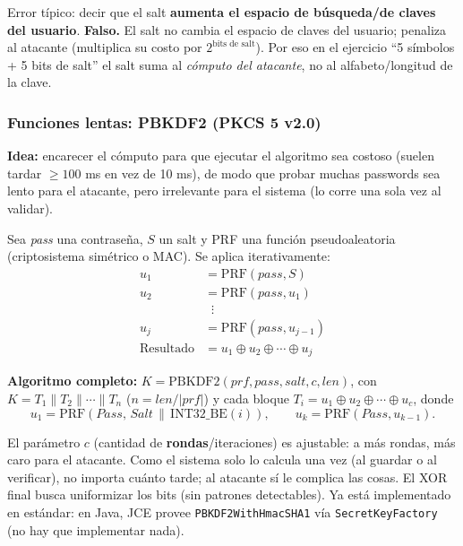 \documentclass[../main.tex]{subfiles}
\begin{document}
\begin{ojo}
Error típico: decir que el salt \textbf{aumenta el espacio de búsqueda/de claves del usuario}. \textbf{Falso.} El salt no cambia el espacio de claves del usuario; penaliza al atacante (multiplica su costo por $2^{\text{bits de salt}}$). Por eso en el ejercicio ``5 símbolos + 5 bits de salt'' el salt suma al \emph{cómputo del atacante}, no al alfabeto/longitud de la clave.
\end{ojo}

\subsubsection{Funciones lentas: PBKDF2 (PKCS 5 v2.0)}

\textbf{Idea:} encarecer el cómputo para que ejecutar el algoritmo sea costoso (suelen tardar $\ge 100$ ms en vez de 10 ms), de modo que probar muchas passwords sea lento para el atacante, pero irrelevante para el sistema (lo corre una sola vez al validar).

Sea \textit{pass} una contraseña, $S$ un salt y PRF una función pseudoaleatoria (criptosistema simétrico o MAC). Se aplica iterativamente:
\begin{align}
u_1 &= \text{PRF}(\textit{pass}, S)\\
u_2 &= \text{PRF}(\textit{pass}, u_1)\\
    &\;\;\vdots\\
u_j &= \text{PRF}(\textit{pass}, u_{j-1})\\
\text{Resultado} &= u_1 \oplus u_2 \oplus \cdots \oplus u_j
\end{align}

\textbf{Algoritmo completo:} $K=\text{PBKDF2}(prf,\textit{pass},salt,c,len)$, con $K=T_1\|T_2\|\cdots\|T_n$ ($n=len/|prf|$) y cada bloque $T_i=u_1\oplus u_2\oplus\cdots\oplus u_c$, donde
$$u_1=\text{PRF}(\textit{Pass},\,Salt\,\|\,\text{INT32\_BE}(i)),\qquad u_k=\text{PRF}(\textit{Pass},u_{k-1}).$$

\begin{destacado}
El parámetro $c$ (cantidad de \textbf{rondas}/iteraciones) es ajustable: a más rondas, más caro para el atacante. Como el sistema solo lo calcula una vez (al guardar o al verificar), no importa cuánto tarde; al atacante sí le complica las cosas. El XOR final busca uniformizar los bits (sin patrones detectables). Ya está implementado en estándar: en Java, JCE provee \texttt{PBKDF2WithHmacSHA1} vía \texttt{SecretKeyFactory} (no hay que implementar nada).
\end{destacado}
\end{document}
